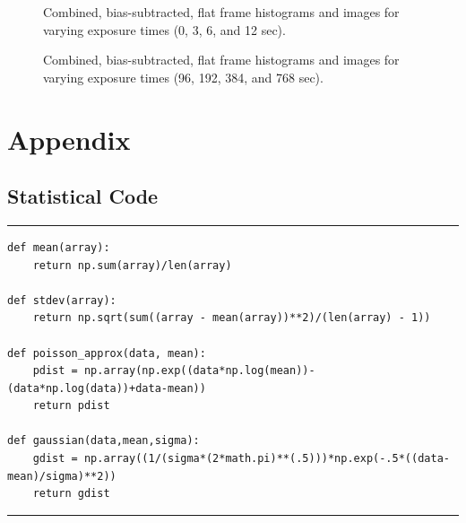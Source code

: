 \documentclass[preprint]{aastex62}
\begin{document}
\begin{figure}[H]
\caption{Combined, bias-subtracted, flat frame histograms and images for varying exposure times (0, 3, 6, and 12 sec). \label{fig:flats1}}
\end{figure}
\begin{figure}[H]
\caption{Combined, bias-subtracted, flat frame histograms and images for varying exposure times (96, 192, 384, and 768 sec). \label{fig:flats2}}
\end{figure}

\newpage
\section{Appendix}


\subsection{Statistical Code} \label{code:stats}
\small
\hrule
\begin{lstlisting}
def mean(array):
    return np.sum(array)/len(array)

def stdev(array):
    return np.sqrt(sum((array - mean(array))**2)/(len(array) - 1))

def poisson_approx(data, mean):
    pdist = np.array(np.exp((data*np.log(mean))-(data*np.log(data))+data-mean))
    return pdist

def gaussian(data,mean,sigma):
    gdist = np.array((1/(sigma*(2*math.pi)**(.5)))*np.exp(-.5*((data-mean)/sigma)**2)) 
    return gdist
\end{lstlisting}
\hrule \vspace{7pt}
\end{document}
